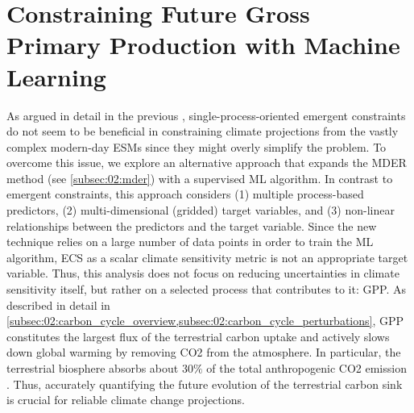 
%



\chapter{Constraining Future Gross Primary Production with Machine Learning}
\label{ch:06:paper_gpp}

As argued in detail in the previous ,
single-process-oriented emergent constraints do not seem to be beneficial in
constraining climate projections from the vastly complex modern-day \acp{ESM}
since they might overly simplify the problem. To overcome this issue, we
explore an alternative approach that expands the \acf{MDER} method (see
\cref{subsec:02:mder}) with a supervised \acf{ML} algorithm. In contrast to
emergent constraints, this approach considers (1) multiple process-based
predictors, (2) multi-dimensional (gridded) target variables, and (3)
non-linear relationships between the predictors and the target variable. Since
the new technique relies on a large number of data points in order to train the
\ac{ML} algorithm, \ac{ECS} as a scalar climate sensitivity metric is not an
appropriate target variable. Thus, this analysis does not focus on reducing
uncertainties in climate sensitivity itself, but rather on a selected process
that contributes to it: \ac{GPP}. As described in detail in
\cref{subsec:02:carbon_cycle_overview,subsec:02:carbon_cycle_perturbations},
\ac{GPP} constitutes the largest flux of the terrestrial carbon uptake and
actively slows down global warming by removing \ac{CO2} from the atmosphere. In
particular, the terrestrial biosphere absorbs about $30 \unit{\%}$ of the total
anthropogenic \ac{CO2} emission \autocite{Friedlingstein2020}. Thus, accurately
quantifying the future evolution of the terrestrial carbon sink is crucial for
reliable climate change projections.

